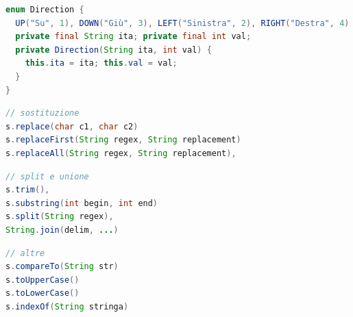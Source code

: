 \vskip3mm

\begin{lstlisting}[language = java, frame = none, basicstyle=\ttfamily\footnotesize]
enum Direction {
  UP("Su", 1), DOWN("Giù", 3), LEFT("Sinistra", 2), RIGHT("Destra", 4)
  private final String ita; private final int val;
  private Direction(String ita, int val) {
    this.ita = ita; this.val = val;
  }
}
\end{lstlisting}

\vskip3mm
\begin{lstlisting}[language = java, frame = none, basicstyle=\ttfamily\footnotesize]
// sostituzione
s.replace(char c1, char c2)
s.replaceFirst(String regex, String replacement)
s.replaceAll(String regex, String replacement), 
\end{lstlisting}
\vskip0mm
\begin{minipage}[t]{0.5\textwidth}
	\begin{lstlisting}[language = java, frame = none, basicstyle=\ttfamily\footnotesize]
// split e unione
s.trim(),   
s.substring(int begin, int end) 
s.split(String regex),   
String.join(delim, ...) 
  \end{lstlisting}
\end{minipage}
%
\begin{minipage}[t]{0.5\textwidth}
	\begin{lstlisting}[language = java, frame = none, basicstyle=\ttfamily\footnotesize]
// altre
s.compareTo(String str)
s.toUpperCase()
s.toLowerCase()
s.indexOf(String stringa)
  \end{lstlisting}
\end{minipage}


